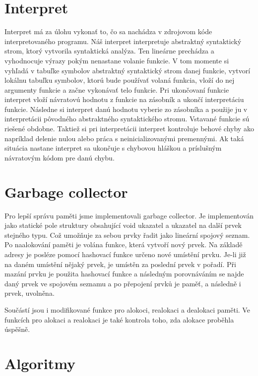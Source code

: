 \documentclass[12pt,a4paper]{report}
\begin{document}
\section{Interpret}
Interpret má za úlohu vykonať to, čo sa nachádza v zdrojovom kóde interpretovaného programu. Náš interpret interpretuje abstraktný syntaktický strom, ktorý vytvorila syntaktická analýza. Ten lineárne prechádza a vyhodnocuje výrazy pokým nenastane volanie funkcie. V tom momente si vyhľadá v tabuľke symbolov abstraktný syntaktický strom danej funkcie, vytvorí lokálnu tabuľku symbolov, ktorú bude používať volaná funkcia, vloží do nej argumenty funkcie a začne vykonávať telo funkcie. Pri ukončovaní funkcie interpret vloží návratovú hodnotu z funkcie na zásobník a ukončí interpretáciu funkcie. Následne si interpret danú hodnotu vyberie zo zásobníka a použije ju v interpretácii pôvodného abstraktného syntaktického stromu. Vstavané funkcie sú riešené obdobne. Taktiež si pri interpretácii interpret kontroluje behové chyby ako napríklad delenie nulou alebo práca s neinicializovanými premennými. Ak taká situácia nastane interpret sa ukončuje s chybovou hláškou a príslušným návratovým kódom pre danú chybu.

\section{Garbage collector}
\par Pro lepší správu paměti jsme implementovali garbage collector. Je implementován jako statické pole struktury obsahující void ukazatel a ukazatel na další prvek stejného typu. Což umožňuje za sebou prvky řadit jako lineární spojový seznam. Po naalokování paměti je volána funkce, která vytvoří nový prvek. Na základě adresy je posléze pomocí hashovací funkce určeno nové umístění prvku. Je-li již na daném umístění nějaký prvek, je umístěn za poslední prvek v pořadí. Při mazání prvku je použita hashovací funkce a následným porovnáváním se najde daný prvek ve spojovém seznamu a po přepojení prvků je paměť, a následně i prvek, uvolněna.
\par Součástí jsou i modifikované funkce pro alokoci, realokaci a dealokaci paměti. Ve funkcích pro alokaci a realokaci je také kontrola toho, zda alokace proběhla úspěšně.

\section{Algoritmy}
\end{document}
